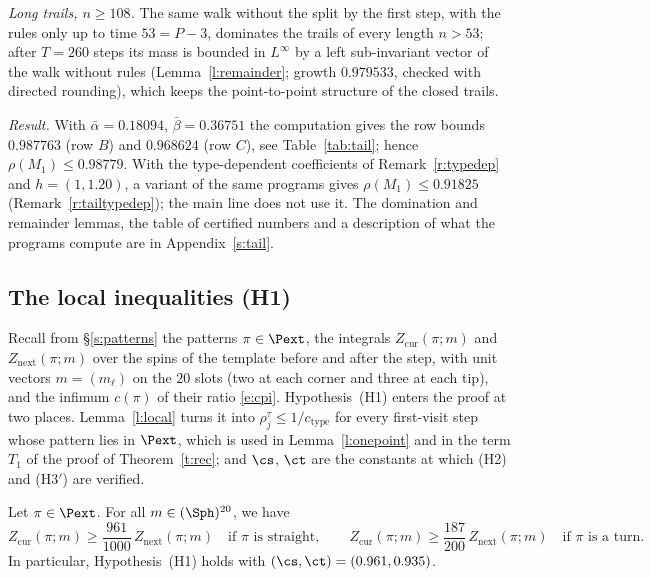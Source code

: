\emph{Long trails, $n \ge 108$.} The same walk without the split by the first step, with the rules only up to time $53 = P - 3$, dominates the trails of every length $n > 53$; after $T = 260$ steps its mass is bounded in $L^\infty$ by a left sub-invariant vector of the walk without rules (Lemma~\ref{l:remainder}; growth $0.979533$, checked with directed rounding), which keeps the point-to-point structure of the closed trails.

\emph{Result.} With $\bar\alpha = 0.18094$, $\bar\beta = 0.36751$ the computation gives the row bounds $0.987763$ (row $B$) and $0.968624$ (row $C$), see Table~\ref{tab:tail}; hence $\rho(M_1) \le 0.98779$. With the type-dependent coefficients of Remark~\ref{r:typedep} and $h = (1, 1.20)$, a variant of the same programs gives $\rho(M_1) \le 0.91825$ (Remark~\ref{r:tailtypedep}); the main line does not use it. The domination and remainder lemmas, the table of certified numbers and a description of what the programs compute are in Appendix~\ref{s:tail}.

\subsection{The local inequalities (H1)}\label{s:H1}

Recall from \S\ref{s:patterns} the patterns $\pi \in \Pext$, the integrals $Z_{\mathrm{cur}}(\pi; m)$ and $Z_{\mathrm{next}}(\pi; m)$ over the spins of the template before and after the step, with unit vectors $m = (m_\ell)$ on the $20$ slots (two at each corner and three at each tip), and the infimum $c(\pi)$ of their ratio \eqref{e:cpi}. Hypothesis~(H1) enters the proof at two places. Lemma~\ref{l:local} turns it into $\rho^\tau_j \le 1/c_{\mathrm{type}}$ for every first-visit step whose pattern lies in $\Pext$, which is used in Lemma~\ref{l:onepoint} and in the term $T_1$ of the proof of Theorem~\ref{t:rec}; and $\cs$, $\ct$ are the constants at which (H2) and (H3$'$) are verified.

\begin{theorem}\label{t:H1}
Let $\pi \in \Pext$. For all $m \in (\Sph)^{20}$, we have
\begin{equation*}
Z_{\mathrm{cur}}(\pi; m) \ge \frac{961}{1000} \, Z_{\mathrm{next}}(\pi; m) \quad \text{if } \pi \text{ is straight}, \qquad Z_{\mathrm{cur}}(\pi; m) \ge \frac{187}{200} \, Z_{\mathrm{next}}(\pi; m) \quad \text{if } \pi \text{ is a turn}.
\end{equation*}
In particular, Hypothesis~(H1) holds with $(\cs, \ct) = (0.961, 0.935)$.
\end{theorem}

